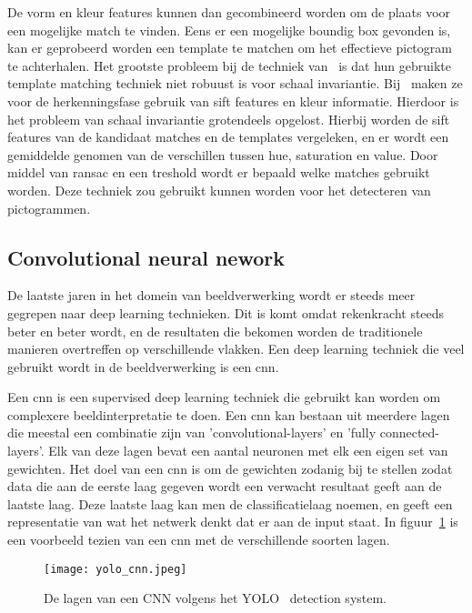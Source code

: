             De vorm en kleur features kunnen dan gecombineerd worden om de plaats voor een mogelijke match te vinden. Eens er een mogelijke boundig box gevonden is,
            kan er geprobeerd worden een template te matchen om het effectieve pictogram te achterhalen. Het grootste probleem bij de techniek van~\cite{Fang2003} is
            dat hun gebruikte template matching techniek niet robuust is voor schaal invariantie.
            Bij~\cite{Zabihi2017} maken ze voor de herkenningsfase gebruik van \gls{sift}\cite{Lowe1999} features en kleur informatie.
            Hierdoor is het probleem van schaal invariantie grotendeels opgelost.
            Hierbij worden de \gls{sift} features van de kandidaat matches en de templates vergeleken, en er wordt een gemiddelde genomen van de verschillen tussen hue, saturation en value.
            Door middel van \gls{ransac} en een treshold wordt er bepaald welke matches gebruikt worden. Deze techniek zou gebruikt kunnen worden voor het detecteren van pictogrammen.

        
        \subsection{Convolutional neural nework}
            De laatste jaren in het domein van beeldverwerking wordt er steeds meer gegrepen naar deep learning technieken. Dit is komt omdat rekenkracht steeds beter en beter wordt, en de resultaten die bekomen worden
            de traditionele manieren overtreffen op verschillende vlakken. Een deep learning techniek die veel gebruikt wordt in de beeldverwerking is een \gls{cnn}.

            Een \gls{cnn} is een supervised deep learning techniek die gebruikt kan worden om complexere beeldinterpretatie te doen.
            Een \gls{cnn} kan bestaan uit meerdere lagen die meestal een combinatie zijn van 'convolutional-layers' en 'fully connected-layers'. Elk van deze lagen bevat een aantal neuronen met elk een eigen set van gewichten.
            Het doel van een \gls{cnn} is om de gewichten zodanig bij te stellen zodat data die aan de eerste laag gegeven wordt een verwacht resultaat geeft aan de laatste laag. 
            Deze laatste laag kan men de classificatielaag noemen, en geeft een representatie van wat het netwerk denkt dat er aan de input staat. In figuur~\ref{fig:yolo_cnn} is een voorbeeld tezien van een \gls{cnn} met de verschillende soorten lagen.

            \begin{figure}[!htb]
                \centering
                \texttt{[image: yolo\_cnn.jpeg]}
                \caption{De lagen van een CNN volgens het YOLO~\cite{Redmon_2016} detection system.}
                \label{fig:yolo_cnn}
            \end{figure}

